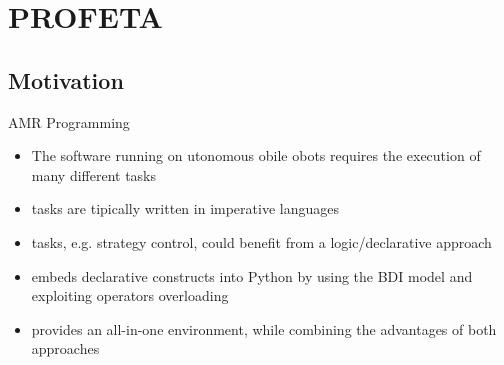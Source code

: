 \section{PROFETA}

\subsection{Motivation}
\begin{frame}[label=1]{AMR Programming}
  \begin{itemize}
    \item
      The software running on utonomous obile obots
      requires the execution of many different tasks
\N  
    \item
       tasks are tipically written in imperative languages 
\n
    \item
       tasks, e.g. strategy control, could benefit 
      from a logic/declarative approach
\N\N  
\pause
    \item
       embeds declarative constructs into Python by
      using the BDI model and exploiting operators overloading
\n    
    \item
       provides an all-in-one environment, while combining
      the advantages of both approaches
  \end{itemize}
% 
\N\N
\end{frame}



